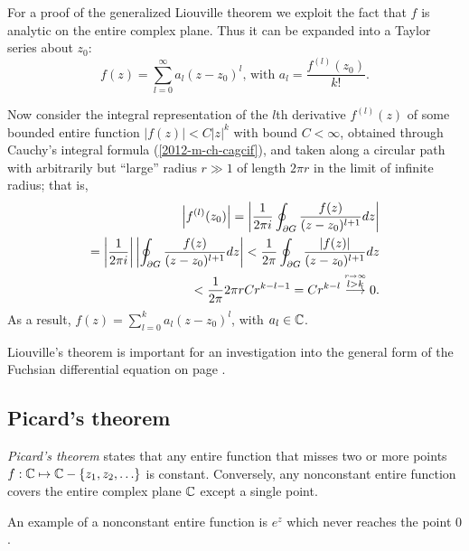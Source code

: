 {\color{OliveGreen}
\bproof
For a proof of the generalized Liouville theorem
we exploit the fact that $f$ is analytic on the entire complex plane.
Thus it can be expanded into a Taylor series about $z_0$:
 \begin{equation}
f(z) = \sum_{l=0}^\infty a_l (z-z_0)^l \text{, with } a_l=\frac{f^{(l)}(z_0)}{k!}  .
 \end{equation}

Now consider the integral representation of the $l$th derivative $f^{(l)}(z)$
of some bounded entire function $\vert f(z)\vert < C \vert z \vert^k $ with bound $C <\infty$,
obtained through Cauchy's integral formula (\ref{2012-m-ch-cagcif}),  and
taken along a circular path with arbitrarily but ``large'' radius $r \gg 1$ of length $2\pi r$ in the limit of infinite radius;
that is,
 \begin{equation}
\begin{split}
\left| f^{(l)}(z_0) \right| = \left|
{1\over 2\pi i}\oint_{\partial G}{f(z)\over
 (z-z_0)^{l+1}}dz
\right|   \\
=
\left|
{1\over 2\pi i}
\right|
\left|
\oint_{\partial G}{  f(z)  \over
 (z-z_0)^{l+1}}dz \right|
<
{1\over 2\pi }
\oint_{\partial G}{ \left| f(z)\right|  \over
 (z-z_0)^{l+1}}dz   \\
<  \frac{1}{2\pi } 2\pi r   C r^{k-l-1}
=  C r^{k-l}  \stackrel{\overset{r\rightarrow \infty}{l>k}}{\longrightarrow} 0   .
\end{split}
 \end{equation}
As a result, $f(z)= \sum_{l=0}^k a_l (z-z_0)^l$, with $a_l\in {\Bbb C}$.
\eproof
}

Liouville's theorem is important for an investigation into the general form of
the Fuchsian differential equation
on page
\pageref{2014-m-ch-sf-glt}.






\subsection{Picard's theorem}
\label{2012-m-ch-ca-pt}
{\em Picard's theorem}
states that any entire function that misses two or more points
$f: {\Bbb C} \mapsto  {\Bbb C} - \{z_1,z_2,\ldots \}$
is constant.
Conversely, any nonconstant entire function covers the entire
complex plane ${\Bbb C}$ except a single point.

An example of a nonconstant entire function is $e^z$ which never reaches the point $0$.

